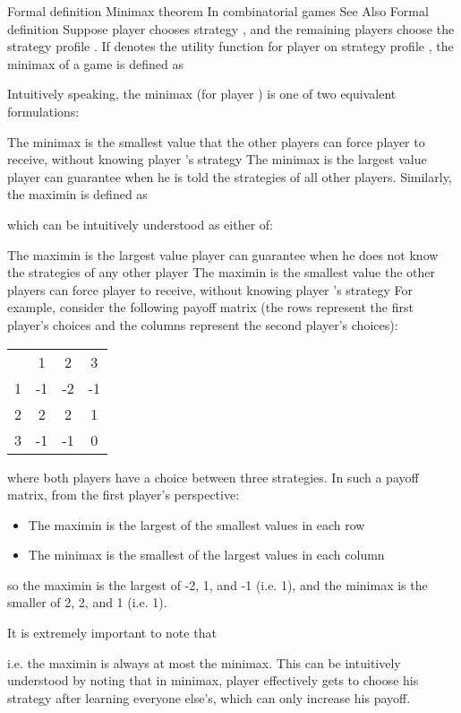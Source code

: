 \documentclass[a4paper,12pt]{article}
\begin{document}
Formal definition
Minimax theorem
In combinatorial games
See Also
Formal definition
Suppose player  chooses strategy , and the remaining players choose the strategy profile . If  denotes the utility function for player on strategy profile , the minimax of a game is defined as


Intuitively speaking, the minimax (for player ) is one of two equivalent formulations:

The minimax is the smallest value that the other players can force player  to receive, without knowing player 's strategy
The minimax is the largest value player  can guarantee when he is told the strategies of all other players.
Similarly, the maximin is defined as


which can be intuitively understood as either of:

The maximin is the largest value player  can guarantee when he does not know the strategies of any other player
The maximin is the smallest value the other players can force player  to receive, without knowing player 's strategy
For example, consider the following payoff matrix (the rows represent the first player's choices and the columns represent the second player's choices):


\begin{tabular}{|c|c|c|c|}
    &  1   &	2   &	3 \\
1   &	-1 &	-2  &	-1 \\
2   &  	2 &	2   &	1 \\
3   &	-1 &	-1  &	0 \\
\end{tabular}
where both players have a choice between three strategies. In such a payoff matrix, from the first player's perspective:

\begin{itemize}
\item The maximin is the largest of the smallest values in each row
\item The minimax is the smallest of the largest values in each column
\end{itemize}
so the maximin is the largest of -2, 1, and -1 (i.e. 1), and the minimax is the smaller of 2, 2, and 1 (i.e. 1).

It is extremely important to note that

i.e. the maximin is always at most the minimax.
This can be intuitively understood by noting that in minimax, player  effectively gets to choose his strategy after learning everyone else's, which can only increase his payoff.
\end{document}

